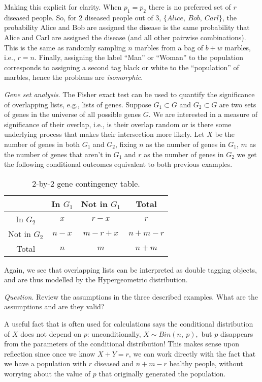 \documentclass[11pt,a4paper]{article}
\begin{document}
Making this explicit for clarity. 
When \(p_{1} = p_{2}\) there is no preferred set of \(r\) diseased people. 
So, for 2 diseased people out of 3, \(\{Alice,\ Bob,\ Carl\}\), 
the probability Alice and Bob are assigned
the disease is the same probability that Alice and Carl are assigned the disease 
(and all other pairwise combinations). 
This is the same as randomly sampling \(n\) marbles from a bag of \(b + w\) marbles, i.e., \(r = n\). 
Finally, assigning the label ``Man'' or ``Woman'' to the population corresponds to 
assigning a second tag black or white to the ``population'' of marbles, 
hence the problems are \emph{isomorphic}.

\emph{Gene set analysis}. 
The Fisher exact test can be used to quantify the 
significance of overlapping lists, e.g., lists of genes. 
Suppose \(G_{1} \subset G\) and \(G_{2} \subset G\) are two sets of genes in the
universe of all possible genes \(G\). 
We are interested in a measure of significance of their overlap, 
i.e., is their overlap random or is there some underlying process that makes their intersection more likely. 
Let \(X\) be the number of genes in both \(G_{1}\) and \(G_{2}\), 
fixing \(n\) as the number of genes in \(G_{1}\), 
\(m\) as the number of genes that aren't in \(G_{1}\) and \(r\) as the number of genes in \(G_{2}\)
we get the following conditional outcomes equivalent to both previous examples.

\begin{table}[h!]
\centering
\begin{tabular}{| c | c | c | c |}
\hline
& In \(G_1\) & Not in \(G_1\) & Total \\\hline
In \(G_2\) & $x$ & $r-x$ & $r$ \\\hline
Not in \(G_2\) & $n-x$ & $m-r+x$ & $n+m-r$ \\\hline
Total & $n$ & $m$ & $n+m$ \\\hline
\end{tabular}
\caption{%
2-by-2 gene contingency table.
}
\end{table}

Again, we see that overlapping lists can be interpreted as double tagging objects, 
and are thus modelled by the Hypergeometric distribution.

\emph{Question}. 
Review the assumptions in the three described examples.
What are the assumptions and are they valid?

A useful fact that is often used for calculations says the 
conditional distribution of \(X\) does not depend on \(p\): unconditionally, 
\(X \sim Bin(n,\ p),\) but \(p\) disappears from the parameters of the conditional distribution! 
This makes sense upon reflection since once we know \(X + Y = r\), 
we can work directly with the fact that we have a population with \(r\) diseased and \(n + m - r\) healthy people, 
without worrying about the value of \(p\) that originally generated the population.
\end{document}
